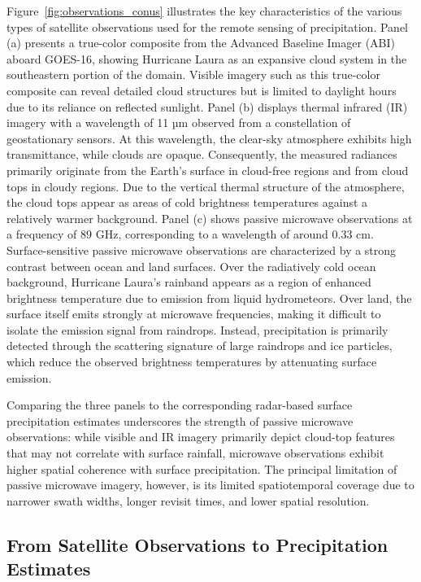 \documentclass[11pt]{article}
\begin{document}
Figure~\ref{fig:observations_conus} illustrates the key characteristics of the
various types of satellite observations used for the remote sensing of
precipitation. Panel (a) presents a true-color composite from the Advanced
Baseline Imager (ABI) aboard GOES-16, showing Hurricane Laura as an expansive
cloud system in the southeastern portion of the domain. Visible imagery such as
this true-color composite can reveal detailed cloud structures but is limited to
daylight hours due to its reliance on reflected sunlight. Panel (b) displays
thermal infrared (IR) imagery with a wavelength of 11 µm observed from a
constellation of geostationary sensors. At this wavelength, the clear-sky
atmosphere exhibits high transmittance, while clouds are opaque. Consequently,
the measured radiances primarily originate from the Earth’s surface in
cloud-free regions and from cloud tops in cloudy regions. Due to the vertical
thermal structure of the atmosphere, the cloud tops appear as areas of cold
brightness temperatures against a relatively warmer background. Panel (c) shows
passive microwave observations at a frequency of 89 GHz, corresponding to a
wavelength of around 0.33 cm. Surface-sensitive passive microwave observations
are characterized by a strong contrast between ocean and land surfaces. Over the
radiatively cold ocean background, Hurricane Laura’s rainband appears as a
region of enhanced brightness temperature due to emission from liquid
hydrometeors. Over land, the surface itself emits strongly at microwave
frequencies, making it difficult to isolate the emission signal from raindrops.
Instead, precipitation is primarily detected through the scattering signature of
large raindrops and ice particles, which reduce the observed brightness
temperatures by attenuating surface emission.

Comparing the three panels to the corresponding radar-based surface
precipitation estimates underscores the strength of passive microwave
observations: while visible and IR imagery primarily depict cloud-top features
that may not correlate with surface rainfall, microwave observations exhibit
higher spatial coherence with surface precipitation. The principal limitation of
passive microwave imagery, however, is its limited spatiotemporal coverage due
to narrower swath widths, longer revisit times, and lower spatial resolution.

\subsection{From Satellite Observations to Precipitation Estimates}
\end{document}

